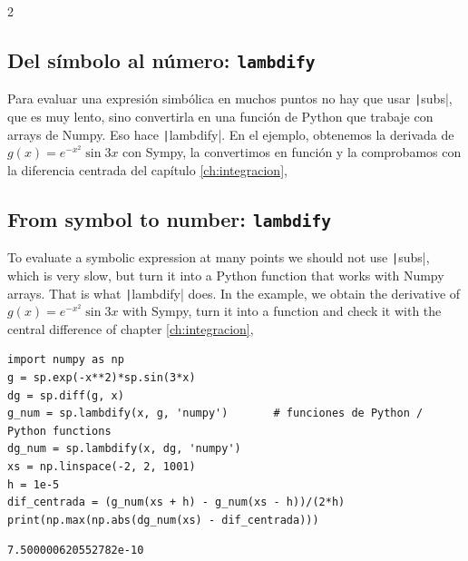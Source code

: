 \begin{paracol}{2}
\subsection{Del símbolo al número: \texttt{lambdify}}
Para evaluar una expresión simbólica en muchos puntos no hay que usar \texttt|subs|, que es muy lento, sino convertirla en una función de Python que trabaje con arrays de Numpy. Eso hace \texttt|lambdify|. En el ejemplo, obtenemos la derivada de $g(x)=e^{-x^2}\sin 3x$ con Sympy, la convertimos en función y la comprobamos con la diferencia centrada del capítulo \ref{ch:integracion},
\switchcolumn
\subsection{From symbol to number: \texttt{lambdify}}
To evaluate a symbolic expression at many points we should not use \texttt|subs|, which is very slow, but turn it into a Python function that works with Numpy arrays. That is what \texttt|lambdify| does. In the example, we obtain the derivative of $g(x)=e^{-x^2}\sin 3x$ with Sympy, turn it into a function and check it with the central difference of chapter \ref{ch:integracion},
\end{paracol}
\begin{verbatim}
import numpy as np
g = sp.exp(-x**2)*sp.sin(3*x)
dg = sp.diff(g, x)
g_num = sp.lambdify(x, g, 'numpy')       # funciones de Python / Python functions
dg_num = sp.lambdify(x, dg, 'numpy')
xs = np.linspace(-2, 2, 1001)
h = 1e-5
dif_centrada = (g_num(xs + h) - g_num(xs - h))/(2*h)
print(np.max(np.abs(dg_num(xs) - dif_centrada)))
\end{verbatim}
\begin{verbatim}
7.500000620552782e-10
\end{verbatim}
